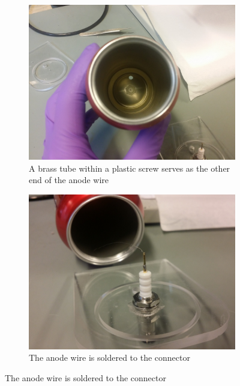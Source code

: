 \documentclass[a4paper]{article}
\begin{document}
\begin{figure}[ht!]
\centering
\begin{subfigure}[t]{0.48\textwidth}
\includegraphics[width=\textwidth]{fig/IMG_20201123_103327.jpg}
\caption{A brass tube within a plastic screw serves as the other end of the anode wire}
\label{fig:anode_mounting}
\end{subfigure}
%
\begin{subfigure}[t]{0.48\textwidth}
\includegraphics[width=\textwidth]{fig/IMG_20201117_121044.jpg}
\caption{The anode wire is soldered to the connector}
\label{fig:connector}
\end{subfigure}


\end{figure}
\end{document}

